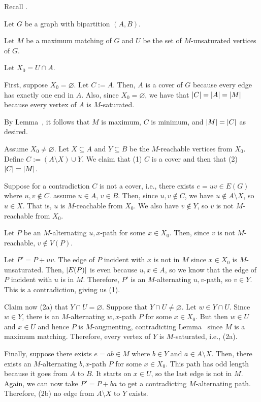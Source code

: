 \documentclass[class=math239,notes,tikz]{agony}
\begin{document}
Recall .

\begin{prf}
  Let $G$ be a graph with bipartition $(A, B)$.

  Let $M$ be a maximum matching of $G$ and
  $U$ be the set of $M$-unsaturated vertices of $G$.

  Let $X_0 = U \cap A$.

  First, suppose $X_0 = \varnothing$.
  Let $C := A$. Then, $A$ is a cover of $G$
  because every edge has exactly one end in $A$.
  Also, since $X_0 = \varnothing$, we have that $\abs{C} = \abs{A} = \abs{M}$
  because every vertex of $A$ is $M$-saturated.
  
  By Lemma~, it follows that $M$ is maximum, $C$ is minimum,
  and $\abs{M} = \abs{C}$ as desired.

  Assume $X_0 \neq \varnothing$.
  Let $X \subseteq A$ and $Y \subseteq B$ be the $M$-reachable vertices from $X_0$.
  Define $C := (A \setminus X) \cup Y$.
  We claim that (1) $C$ is a cover and then that (2) $\abs{C} = \abs{M}$.

  Suppose for a contradiction $C$ is not a cover, i.e.,
  there exists $e = uv \in E(G)$ where $u,v \not\in C$.
  \WLOG assume $u \in A$, $v \in B$.
  Then, since $u,v \not\in C$,
  we have $u \not\in A \setminus X$, so $u \in X$.
  That is, $u$ is $M$-reachable from $X_0$.
  We also have $v \not\in Y$, so $v$ is not $M$-reachable from $X_0$.

  Let $P$ be an $M$-alternating $u,x$-path for some $x \in X_0$.
  Then, since $v$ is not $M$-reachable, $v \not\in V(P)$.

  Let $P' = P + uv$.
  The edge of $P$ incident with $x$ is not in $M$ since $x \in X_0$ is $M$-unsaturated.
  Then, $\abs{E(P)}$ is even because $u,x \in A$,
  so we know that the edge of $P$ incident with $u$ is in $M$.
  Therefore, $P'$ is an $M$-alternating $u,v$-path, so $v \in Y$.
  This is a contradiction, giving us (1).

  Claim now (2a) that $Y \cap U = \varnothing$.
  Suppose that $Y \cap U \neq \varnothing$.
  Let $w \in Y \cap U$.
  Since $w \in Y$, there is an $M$-alternating $w,x$-path $P$ for some $x \in X_0$.
  But then $w \in U$ and $x \in U$ and hence $P$ is $M$-augmenting,
  contradicting Lemma~ since $M$ is a maximum matching.
  Therefore, every vertex of $Y$ is $M$-saturated, i.e., (2a).

  Finally, suppose there exists $e = ab \in M$
  where $b \in Y$ and $a \in A \setminus X$.
  Then, there exists an $M$-alternating $b,x$-path $P$ for some $x \in X_0$.
  This path has odd length because it goes from $A$ to $B$.
  It starts on $x \in U$, so the last edge is not in $M$.
  Again, we can now take $P' = P + ba$
  to get a contradicting $M$-alternating path.
  Therefore, (2b) no edge from $A \setminus X$ to $Y$ exists.


\end{prf}
\end{document}
